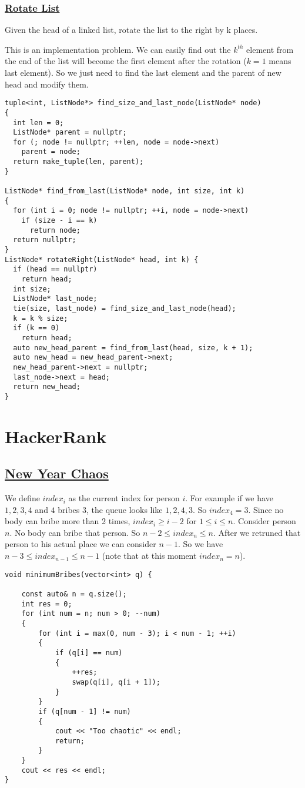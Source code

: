 \documentclass{book}
\begin{document}
	\subsection{\href{https://leetcode.com/problems/rotate-list/}{Rotate List}}
	Given the head of a linked list, rotate the list to the right by k places.
	\par This is an implementation problem. We can easily find out the $k^{th}$ element from the end of the list will become the first element after the rotation ($k = 1$ means last element). So we just need to find the last element and the parent of new head and modify them.
	\begin{lstlisting}
tuple<int, ListNode*> find_size_and_last_node(ListNode* node)
{
  int len = 0;
  ListNode* parent = nullptr;
  for (; node != nullptr; ++len, node = node->next)
    parent = node;
  return make_tuple(len, parent);
}

ListNode* find_from_last(ListNode* node, int size, int k)
{
  for (int i = 0; node != nullptr; ++i, node = node->next)
    if (size - i == k)
      return node;
  return nullptr;
}
ListNode* rotateRight(ListNode* head, int k) {
  if (head == nullptr)
    return head;
  int size;
  ListNode* last_node;
  tie(size, last_node) = find_size_and_last_node(head);
  k = k % size;
  if (k == 0)
    return head;
  auto new_head_parent = find_from_last(head, size, k + 1);
  auto new_head = new_head_parent->next;
  new_head_parent->next = nullptr;
  last_node->next = head;
  return new_head;
}
	\end{lstlisting}
	\chapter{HackerRank}
	\section{\href{https://www.hackerrank.com/challenges/new-year-chaos/problem}{New Year Chaos}}
	 We define $index_i$ as the current index for person $i$. For example if we have $1, 2, 3, 4$ and $4$ bribes $3$, the queue looks like $1, 2, 4, 3$. So $index_4 = 3$. Since no body can bribe more than 2 times, $index_i \ge i - 2$ for $1 \le i \le n$. Consider person $n$. No body can bribe that person. So $n - 2 \le index_n \le n$. After we retruned that person to his actual place we can consider $n - 1$. So we have $n - 3 \le index_{n - 1} \le n - 1$ (note that at this moment $index_n = n$).
	 \begin{lstlisting}
void minimumBribes(vector<int> q) {

    const auto& n = q.size();
    int res = 0;
    for (int num = n; num > 0; --num)
    {
        for (int i = max(0, num - 3); i < num - 1; ++i)
        {
            if (q[i] == num)
            {
                ++res;
                swap(q[i], q[i + 1]);
            }
        }
        if (q[num - 1] != num)
        {
            cout << "Too chaotic" << endl;
            return;
        }
    }
    cout << res << endl;
}
	 \end{lstlisting}
	 
\end{document}
